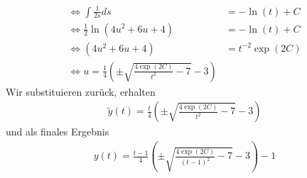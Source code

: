 \begin{solution}
\begin{align*}
  \iff \int \frac{1}{2s} ds &= -\ln(t) + C \\
  \iff \frac{1}{2}\ln(4u^2 + 6u + 4) &= -\ln(t) + C \\
  \iff (4u^2 + 6u + 4) &= t^{-2}\exp(2C)\\
  \iff u = \frac{1}{4}\left(\pm\sqrt{\frac{4\exp(2C)}{t^2} - 7} - 3\right)
\end{align*}
Wir substituieren zurück, erhalten
\begin{align*}
  \widetilde{y}(t) = \frac{t}{4}\left(\pm\sqrt{\frac{4\exp(2C)}{t^2} - 7} - 3\right)
\end{align*}
und als finales Ergebnis
\begin{align*}
  y(t) = \frac{t-1}{4}\left(\pm\sqrt{\frac{4\exp(2C)}{(t-1)^2} - 7} - 3\right) - 1
\end{align*}
\\
\end{solution}

